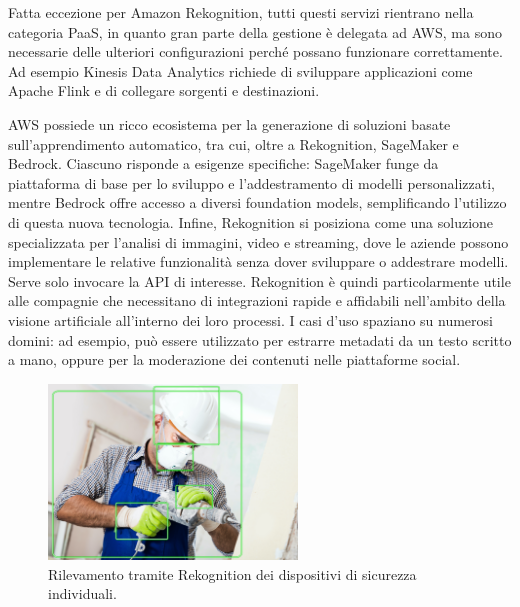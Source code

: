 Fatta eccezione per Amazon Rekognition, tutti questi servizi rientrano nella categoria PaaS, in quanto gran parte della gestione è delegata ad AWS, ma sono necessarie delle ulteriori configurazioni perché possano funzionare correttamente. Ad esempio Kinesis Data Analytics richiede di sviluppare applicazioni come Apache Flink e di collegare sorgenti e destinazioni. %

AWS possiede un ricco ecosistema per la generazione di soluzioni basate sull'apprendimento automatico, tra cui, oltre a Rekognition, SageMaker e Bedrock. Ciascuno risponde a esigenze specifiche: SageMaker funge da piattaforma di base per lo sviluppo e l'addestramento di modelli personalizzati, mentre Bedrock offre accesso a diversi foundation models, semplificando l'utilizzo di questa nuova tecnologia. Infine, Rekognition si posiziona come una soluzione specializzata per l’analisi di immagini, video e streaming, dove le aziende possono implementare le relative funzionalità senza dover sviluppare o addestrare modelli. Serve solo invocare la API di interesse. Rekognition è quindi particolarmente utile alle compagnie che necessitano di integrazioni rapide e affidabili nell'ambito della visione artificiale all'interno dei loro processi. I casi d'uso spaziano su numerosi domini: ad esempio, può essere utilizzato per estrarre metadati da un testo scritto a mano, oppure per la moderazione dei contenuti nelle piattaforme social.

\begin{figure}[htbp]
    \centering
    \includegraphics[width=0.59\textwidth]{figures/worker-with-bb.png}
    \caption{Rilevamento tramite Rekognition dei dispositivi di sicurezza individuali.}
    \label{fig:ppe-example}
\end{figure}


